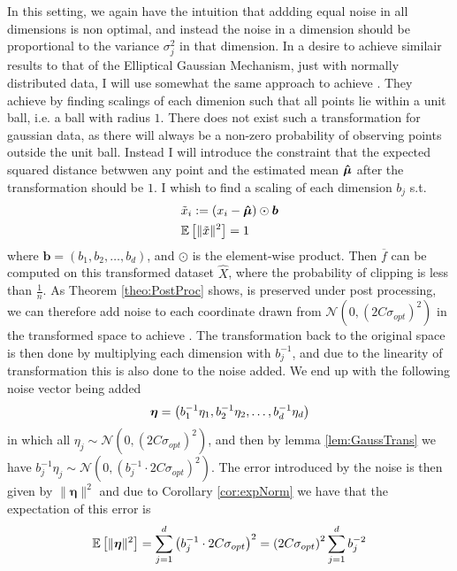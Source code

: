 \documentclass[a4paper,12pt]{article}
\begin{document}
In this setting, we again have the intuition that addding equal noise in all dimensions is non optimal, and instead the noise in a dimension should be proportional
to the variance $\sigma_j^2$ in that dimension. In a desire to achieve similair results to that of the Elliptical Gaussian Mechanism, just with normally distributed data,
I will use somewhat the same approach to achieve \edp.
They achieve \edp by finding scalings of each dimenion such that all points lie within a unit ball, i.e. a ball with radius $1$. 
There does not exist such a transformation for gaussian data, as there will always be a non-zero 
probability of observing points outside the unit ball.
Instead I will introduce the constraint that the expected squared distance betwwen any point and the estimated mean $\bm{\hat{\mu}}$ after the transformation should be $1$. 
I whish to find a scaling of each dimension $b_j$ s.t.
\begin{align}
    &\tilde{x}_i := (x_i - \bm{\hat{\mu}}) \odot \bm{b} \\
\label{eq:Alg3Con}
    &\mathbb{E} \left [ \| \tilde{x} \|^2 \right] = 1
\end{align}
where $\bm{b} = (b_1, b_2, \dots, b_d)$, and $\odot$ is the element-wise product. 
Then $\overline{f}$ can be computed on this transformed dataset $\widehat{X}$, where the probability of clipping is less than $\frac{1}{n}$.
As Theorem \ref{theo:PostProc} shows, \edp is preserved under post processing, 
we can therefore add noise to each coordinate drawn from $\mathcal{N}(0,(2C\sigma_{opt})^2)$ in the transformed space to achieve \edp.
The transformation back to the original space is then done by multiplying each dimension with $b_j^{-1}$, and due to the linearity of transformation 
this is also done to the noise added.
We end up with the following noise vector being added
\[
    \bm{\eta} = \left ( b_1^{-1}\eta_1, b_2^{-1}\eta_2, \dots, b_d^{-1}\eta_d \right)
\]
in which all $\eta_j \sim \mathcal{N}(0,(2C\sigma_{opt})^2)$, and then by lemma \ref{lem:GaussTrans} we have $b_j^{-1}\eta_j \sim \mathcal{N}(0, (b_j^{-1} \cdot 2C\sigma_{opt})^2)$.
The error introduced by the noise is then given by $\| \bm{\eta} \|^2$ and due to Corollary \ref{cor:expNorm} we have that the expectation of this error is 
\begin{equation}
\label{eq:Alg3Err}
    \mathbb{E} \left [ \| \bm{\eta} \|^2 \right] = \sum_{j=1}^d \left (b_j^{-1} \cdot 2C\sigma_{opt}\right)^2   = \left (2C\sigma_{opt}\right)^2 \sum_{j=1}^d b_j^{-2}
\end{equation}
\end{document}
